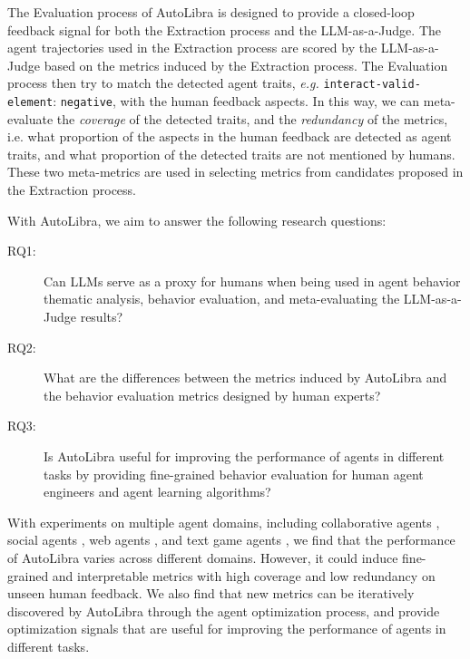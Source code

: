 The Evaluation process of AutoLibra is designed to provide a closed-loop feedback signal for both the Extraction process
and the LLM-as-a-Judge. The agent trajectories used in the Extraction process are scored by the LLM-as-a-Judge based
on the metrics induced by the Extraction process. The Evaluation process then try to match the detected agent traits,
\emph{e.g.} \texttt{interact-valid-element}: \texttt{negative}, with the human feedback aspects.
In this way, we can meta-evaluate the \emph{coverage} of the detected traits, and the \emph{redundancy} of the metrics,
i.e. what proportion of the aspects in the human feedback are detected as agent traits,
and what proportion of the detected traits are not mentioned by humans. These two meta-metrics are used in selecting
metrics from candidates proposed in the Extraction process.



With AutoLibra, we aim to answer the following research questions:
\begin{description}
    \item[RQ1:] Can LLMs serve as a proxy for humans when being used in agent behavior thematic analysis,
    behavior evaluation, and meta-evaluating the LLM-as-a-Judge results?
    \item[RQ2:] What are the differences between the metrics induced by AutoLibra and the behavior evaluation
    metrics designed by human experts?
    \item[RQ3:] Is AutoLibra useful for improving the performance of agents in different tasks by 
    providing fine-grained behavior evaluation for human agent engineers and agent learning algorithms?
\end{description}

With experiments on multiple agent domains, including collaborative agents \citep{shao2024collaborative}, social agents 
\citep{zhousotopia}, web agents \citep{zhouwebarena,he2024webvoyager}, and text game agents \citep{paglieri2024balrog,cloos2024babaaibreakrules}, 
we find that the performance of AutoLibra varies across different domains. 
However, it could induce fine-grained and interpretable metrics with high coverage and low redundancy on unseen human feedback.
We also find that new metrics can be iteratively discovered by AutoLibra through the agent optimization process,
and provide optimization signals that are useful for improving the performance of agents in different tasks.




